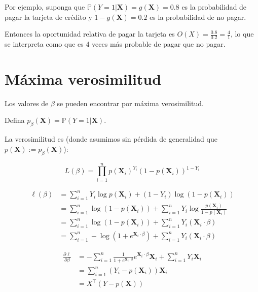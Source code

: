 \documentclass[
  12pt,
]{book}
\theoremstyle{definition}
\theoremstyle{definition}
\theoremstyle{definition}
\theoremstyle{definition}
\theoremstyle{remark}
\begin{document}
Por ejemplo, suponga que \(\mathbb{P}\left(Y=1\vert \boldsymbol{X}\right) = g(\boldsymbol{X}) = 0.8\) es la probabilidad de pagar la tarjeta de crédito y \(1-g(\boldsymbol{X}) = 0.2\) es la probabilidad de no pagar.

Entonces la oportunidad relativa de pagar la tarjeta es \(O(X) = \frac{0.8}{0.2} = \frac{4}{1}\), lo que se interpreta como que es 4 veces más probable de pagar que no pagar.

\hypertarget{muxe1xima-verosimilitud}{%
\section{Máxima verosimilitud}\label{muxe1xima-verosimilitud}}

Los valores de \(\beta\) se pueden encontrar por máxima verosimilitud.

Defina \(p_{\beta}(\boldsymbol{X}) = \mathbb{P}\left(Y=1\vert \boldsymbol{X}\right)\).

La verosimilitud es (donde asumimos sin pérdida de generalidad que \(p(\boldsymbol{X}):=p_{\beta}(\boldsymbol{X})\)):

\[
L\left(\beta\right)=\prod_{i=1}^{n} p\left(\boldsymbol{X}_{i}\right)^{Y_{i}}\left(1-p\left(\boldsymbol{X}_{i}\right)\right)^{1-Y_{i}}
\]

\begin{align*}
\ell\left(\beta\right) 
&=\sum_{i=1}^{n} Y_{i} \log p\left(\boldsymbol{X}_{i}\right)+\left(1-Y_{i}\right) \log \left(1-p\left(\boldsymbol{X}_{i}\right)\right) \\
&=\sum_{i=1}^{n} \log \left(1-p\left(\boldsymbol{X}_{i}\right)\right)+\sum_{i=1}^{n} Y_{i} \log \frac{p\left(\boldsymbol{X}_{i}\right)}{1-p\left(\boldsymbol{X}_{i}\right)} \\
&=\sum_{i=1}^{n} \log \left(1-p\left(\boldsymbol{X}_{i}\right)\right)+\sum_{i=1}^{n} Y_{i}\left(\boldsymbol{X}_{i} \cdot \beta\right) \\
&=\sum_{i=1}^{n}-\log \left(1+e^{\boldsymbol{X}_{i} \cdot \beta}\right)+\sum_{i=1}^{n} Y_{i}\left(\boldsymbol{X}_{i} \cdot \beta\right)
\end{align*}

\begin{align*}
\frac{\partial \ell}{\partial \beta} 
&=-\sum_{i=1}^{n} \frac{1}{1+e^{\boldsymbol{X}_{i} \cdot \beta}} e^{\boldsymbol{X}_{i} \cdot \beta} \boldsymbol{X}_{i}+\sum_{i=1}^{n} Y_{i} \boldsymbol{X}_{i} \\
&=\sum_{i=1}^{n}\left(Y_{i}-p\left(\boldsymbol{X}_{i}\right)\right) \boldsymbol{X}_{i} \\
&= X^{\top}(Y-p(\boldsymbol{X}))
\end{align*}
\end{document}
